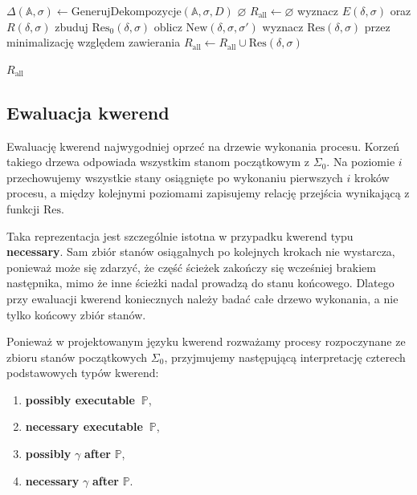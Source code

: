 \documentclass[11pt,a4paper]{article}
\theoremstyle{definition}
\begin{document}
\begin{algorithm}[H]
\caption{Pseudokod dla algorytmu generującego funkcję $\mathrm{Res}$ dla akcji złożonej}
\label{alg:generuj-res-zlozone}
\begin{algorithmic}[1]
        \State $\Delta(\mathbb{A},\sigma) \gets \mathrm{GenerujDekompozycje}(\mathbb{A}, \sigma, D)$
            \Return $\varnothing$
        \EndIf
        \State $R_{\mathrm{all}} \leftarrow \varnothing$
            \State wyznacz $E(\delta,\sigma)$ oraz $R(\delta,\sigma)$
            \State zbuduj $\mathrm{Res}_0(\delta,\sigma)$
                \State oblicz $\mathrm{New}(\delta,\sigma,\sigma')$
            \EndFor
            \State wyznacz $\mathrm{Res}(\delta,\sigma)$ przez minimalizację względem zawierania
            \State $R_{\mathrm{all}} \leftarrow R_{\mathrm{all}} \cup \mathrm{Res}(\delta,\sigma)$
        \EndFor
        
        \Return $R_{\mathrm{all}}$
    \EndProcedure
\end{algorithmic}
\end{algorithm}

\subsection{Ewaluacja kwerend}
\label{sec:alg-ewaluacja}

Ewaluację kwerend najwygodniej oprzeć na drzewie wykonania procesu. Korzeń takiego drzewa odpowiada wszystkim stanom początkowym z $\Sigma_0$. Na poziomie $i$ przechowujemy wszystkie stany osiągnięte po wykonaniu pierwszych $i$ kroków procesu, a między kolejnymi poziomami zapisujemy relację przejścia wynikającą z funkcji $\mathrm{Res}$.

Taka reprezentacja jest szczególnie istotna w przypadku kwerend typu \textbf{necessary}. Sam zbiór stanów osiągalnych po kolejnych krokach nie wystarcza, ponieważ może się zdarzyć, że część ścieżek zakończy się wcześniej brakiem następnika, mimo że inne ścieżki nadal prowadzą do stanu końcowego. Dlatego przy ewaluacji kwerend koniecznych należy badać całe drzewo wykonania, a nie tylko końcowy zbiór stanów.

Ponieważ w projektowanym języku kwerend rozważamy procesy rozpoczynane ze zbioru stanów początkowych $\Sigma_0$, przyjmujemy następującą interpretację czterech podstawowych typów kwerend:
\begin{enumerate}
    \item \textbf{possibly executable} $\ \mathbb{P}$,
    \item \textbf{necessary executable} $\ \mathbb{P}$,
    \item \textbf{possibly} $\gamma$ \textbf{after} $\mathbb{P}$,
    \item \textbf{necessary} $\gamma$ \textbf{after} $\mathbb{P}$.
\end{enumerate}
\end{document}
